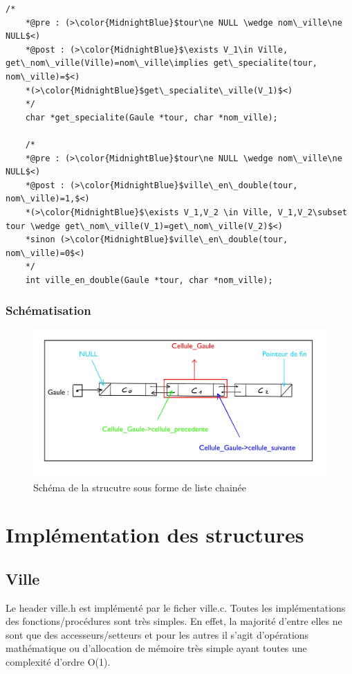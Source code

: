 \documentclass[a4paper, 11pt, oneside]{article}
\begin{document}
\begin{lstlisting}[caption = {Spécification des fonctions et procédures du header "gaule.h"}]
    /*
    *@pre : (>\color{MidnightBlue}$tour\ne NULL \wedge nom\_ville\ne NULL$<)
    *@post : (>\color{MidnightBlue}$\exists V_1\in Ville, get\_nom\_ville(Ville)=nom\_ville\implies get\_specialite(tour, nom\_ville)=$<)
    *(>\color{MidnightBlue}$get\_specialite\_ville(V_1)$<)
    */
    char *get_specialite(Gaule *tour, char *nom_ville);

    /*
    *@pre : (>\color{MidnightBlue}$tour\ne NULL \wedge nom\_ville\ne NULL$<)
    *@post : (>\color{MidnightBlue}$ville\_en\_double(tour, nom\_ville)=1,$<)
    *(>\color{MidnightBlue}$\exists V_1,V_2 \in Ville, V_1,V_2\subset tour \wedge get\_nom\_ville(V_1)=get\_nom\_ville(V_2)$<)
    *sinon (>\color{MidnightBlue}$ville\_en\_double(tour, nom\_ville)=0$<)
    */
    int ville_en_double(Gaule *tour, char *nom_ville);
\end{lstlisting}

\subsubsection{Schématisation}
\begin{figure}[h]
    \centering
    \includegraphics[scale=0.22]{schéma_liste_chainée.jpeg}
    \caption{Schéma de la strucutre sous forme de liste chainée}
\end{figure}

\section{\textbf{Implémentation des structures}}
\subsection{\textbf{Ville}}
Le header ville.h est implémenté par le ficher ville.c. Toutes les implémentations des fonctions/procédures 
sont très simples. En effet, la majorité d'entre elles ne sont que des accesseurs/setteurs et pour les autres 
il s'agit d'opérations mathématique ou d'allocation de mémoire très simple ayant toutes une complexité d'ordre O(1).
\end{document}
